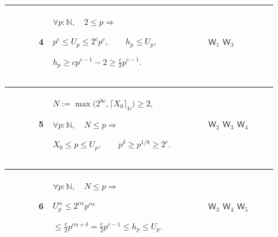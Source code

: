 \documentclass[12pt,reqno]{amsart}
\theoremstyle{blueplain}
\numberwithin{equation}{section}
\begin{document}
{\scriptsize \setlength{\parskip}{0pt}\nointerlineskip
\noindent 
\begin{tabular}{|@{}>{\centering\arraybackslash}m{0.10658\linewidth}|>{\centering\arraybackslash}m{0.03553\linewidth}|>{\centering\arraybackslash}m{0.52105\linewidth}|>{\centering\arraybackslash}m{0.23684\linewidth}|}
\hline
{\hypertarget{row:W4}{$\mathsf{W}$}} & {4} & {$\displaystyle \forall p:%
\mathbb{N},\quad2\le p\Rightarrow$ \par$\displaystyle p^c\le
U_p\le2^cp^c,\qquad h_p\le U_p,$ \par$\displaystyle h_p\ge
cp^{c-1}-2\ge\frac c2p^{c-1}.$} & {\hyperlink{row:W1}{$\mathsf{W}_{1}$} 
\hyperlink{row:W3}{$\mathsf{W}_{3}$}} \\ \hline
\end{tabular}%
}

{\scriptsize \setlength{\parskip}{0pt}\nointerlineskip
\noindent 
\begin{tabular}{|@{}>{\centering\arraybackslash}m{0.10658\linewidth}|>{\centering\arraybackslash}m{0.03553\linewidth}|>{\centering\arraybackslash}m{0.52105\linewidth}|>{\centering\arraybackslash}m{0.23684\linewidth}|}
\hline
{\hypertarget{row:W5}{$\mathsf{W}$}} & {5} & {$\displaystyle N:=\max\bigl(%
2^{8c},\lceil X_0\rceil_{\mathbb{N}}\bigr)\ge2,$ \par$\displaystyle \forall
p:\mathbb{N},\quad N\le p\Rightarrow$ \par$\displaystyle X_0\le p\le
U_p,\qquad p^\delta\ge p^{1/8}\ge2^c.$} & {\hyperlink{row:W2}{$\mathsf{W}%
_{2} $} \hyperlink{row:W3}{$\mathsf{W}_{3}$} \hyperlink{row:W4}{$\mathsf{W}%
_{4}$}} \\ \hline
\end{tabular}%
}

{\scriptsize \setlength{\parskip}{0pt}\nointerlineskip
\noindent 
\begin{tabular}{|@{}>{\centering\arraybackslash}m{0.10658\linewidth}|>{\centering\arraybackslash}m{0.03553\linewidth}|>{\centering\arraybackslash}m{0.52105\linewidth}|>{\centering\arraybackslash}m{0.23684\linewidth}|}
\hline
{\hypertarget{row:W6}{$\mathsf{W}$}} & {6} & {$\displaystyle \forall p:%
\mathbb{N},\quad N\le p\Rightarrow$ \par$\displaystyle U_p^\alpha\le2^{c%
\alpha}p^{c\alpha}$ \par$\displaystyle \le\frac c2p^{c\alpha+\delta}=\frac
c2p^{c-1}\le h_p\le U_p.$} & {\hyperlink{row:W3}{$\mathsf{W}_{3}$} 
\hyperlink{row:W4}{$\mathsf{W}_{4}$} \hyperlink{row:W5}{$\mathsf{W}_{5}$}}
\\ \hline
\end{tabular}%
}
\end{document}
